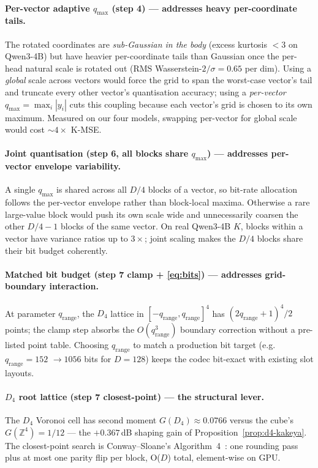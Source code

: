 \documentclass[11pt,a4paper]{article}
\theoremstyle{definition}
\theoremstyle{plain}
\newcommand{\Z}{\mathbb{Z}}
\begin{document}
\paragraph{Per-vector adaptive $q_\mathrm{max}$ (step 4) ---
addresses heavy per-coordinate tails.}
The rotated coordinates are \emph{sub-Gaussian in the body} (excess
kurtosis $< 3$ on Qwen3-4B) but have heavier per-coordinate tails
than Gaussian once the per-head natural scale is rotated out (RMS
Wasserstein-$2/\sigma = 0.65$ per dim). Using a \emph{global}
scale across vectors would force the grid to span the worst-case
vector's tail and truncate every other vector's quantisation
accuracy; using a \emph{per-vector} $q_\mathrm{max} = \max_i |y_i|$
cuts this coupling because each vector's grid is chosen to its own
maximum. Measured on our four models, swapping per-vector for
global scale would cost $\sim\!4\times$ K-MSE.

\paragraph{Joint quantisation (step 6, all blocks share $q_\mathrm{max}$) ---
addresses per-vector envelope variability.}
A single $q_\mathrm{max}$ is shared across all $D/4$ blocks of a
vector, so bit-rate allocation follows the per-vector envelope
rather than block-local maxima. Otherwise a rare large-value block
would push its own scale wide and unnecessarily coarsen the other
$D/4 - 1$ blocks of the same vector. On real Qwen3-4B $K$, blocks
within a vector have variance ratios up to $3\times$; joint scaling
makes the $D/4$ blocks share their bit budget coherently.

\paragraph{Matched bit budget (step 7 clamp + \eqref{eq:bits}) ---
addresses grid-boundary interaction.}
At parameter $q_\mathrm{range}$, the $D_4$ lattice in
$[-q_\mathrm{range}, q_\mathrm{range}]^4$ has
$(2q_\mathrm{range}+1)^4/2$ points; the clamp step absorbs the
$O(q_\mathrm{range}^3)$ boundary correction without a pre-listed
point table. Choosing $q_\mathrm{range}$ to match a production
bit target (e.g.\ $q_\mathrm{range}=152$ $\to 1056$ bits for $D=128$)
keeps the codec bit-exact with existing slot layouts.

\paragraph{$D_4$ root lattice (step 7 closest-point) --- the
structural lever.}
The $D_4$ Voronoi cell has second moment
$G(D_4)\approx 0.0766$ versus the cube's $G(\Z^4) = 1/12$ --- the
$+0.367\,$dB shaping gain of Proposition~\ref{prop:d4-kakeya}. The
closest-point search is Conway--Sloane's
Algorithm~4~\cite{conway-sloane-d4}: one rounding pass plus at
most one parity flip per block, O($D$) total, element-wise on
GPU.
\end{document}
